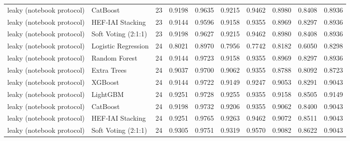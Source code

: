 \begin{tabular}{llrrrrrrrr}
leaky (notebook protocol) & CatBoost & 23 & 0.9198 & 0.9635 & 0.9215 & 0.9462 & 0.8980 & 0.8408 & 0.8936 \\
leaky (notebook protocol) & HEF-IAI Stacking & 23 & 0.9144 & 0.9596 & 0.9158 & 0.9355 & 0.8969 & 0.8297 & 0.8936 \\
leaky (notebook protocol) & Soft Voting (2:1:1) & 23 & 0.9198 & 0.9627 & 0.9215 & 0.9462 & 0.8980 & 0.8408 & 0.8936 \\
leaky (notebook protocol) & Logistic Regression & 24 & 0.8021 & 0.8970 & 0.7956 & 0.7742 & 0.8182 & 0.6050 & 0.8298 \\
leaky (notebook protocol) & Random Forest & 24 & 0.9144 & 0.9723 & 0.9158 & 0.9355 & 0.8969 & 0.8297 & 0.8936 \\
leaky (notebook protocol) & Extra Trees & 24 & 0.9037 & 0.9700 & 0.9062 & 0.9355 & 0.8788 & 0.8092 & 0.8723 \\
leaky (notebook protocol) & XGBoost & 24 & 0.9144 & 0.9722 & 0.9149 & 0.9247 & 0.9053 & 0.8291 & 0.9043 \\
leaky (notebook protocol) & LightGBM & 24 & 0.9251 & 0.9728 & 0.9255 & 0.9355 & 0.9158 & 0.8505 & 0.9149 \\
leaky (notebook protocol) & CatBoost & 24 & 0.9198 & 0.9732 & 0.9206 & 0.9355 & 0.9062 & 0.8400 & 0.9043 \\
leaky (notebook protocol) & HEF-IAI Stacking & 24 & 0.9251 & 0.9765 & 0.9263 & 0.9462 & 0.9072 & 0.8511 & 0.9043 \\
leaky (notebook protocol) & Soft Voting (2:1:1) & 24 & 0.9305 & 0.9751 & 0.9319 & 0.9570 & 0.9082 & 0.8622 & 0.9043 \\
\bottomrule
\end{tabular}
